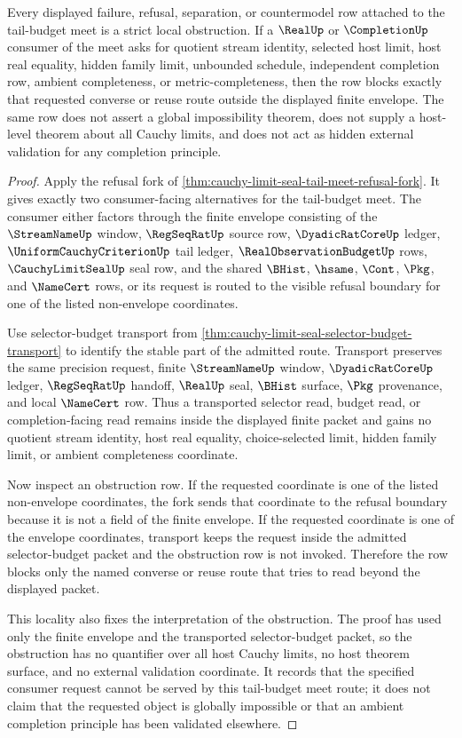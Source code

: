 \begin{corollary}
\label{cor:cauchy-limit-seal-tail-budget-meet-strict-local-obstruction}
Every displayed failure, refusal, separation, or countermodel row attached to the tail-budget meet is a strict local obstruction. If a $\RealUp$ or $\CompletionUp$ consumer of the meet asks for quotient stream identity, selected host limit, host real equality, hidden family limit, unbounded schedule, independent completion row, ambient completeness, or metric-completeness, then the row blocks exactly that requested converse or reuse route outside the displayed finite envelope. The same row does not assert a global impossibility theorem, does not supply a host-level theorem about all Cauchy limits, and does not act as hidden external validation for any completion principle.
\end{corollary}
\begin{proof}
Apply the refusal fork of \autoref{thm:cauchy-limit-seal-tail-meet-refusal-fork}. It gives exactly two consumer-facing alternatives for the tail-budget meet. The consumer either factors through the finite envelope consisting of the $\StreamNameUp$ window, $\RegSeqRatUp$ source row, $\DyadicRatCoreUp$ ledger, $\UniformCauchyCriterionUp$ tail ledger, $\RealObservationBudgetUp$ rows, $\CauchyLimitSealUp$ seal row, and the shared $\BHist$, $\hsame$, $\Cont$, $\Pkg$, and $\NameCert$ rows, or its request is routed to the visible refusal boundary for one of the listed non-envelope coordinates.

Use selector-budget transport from \autoref{thm:cauchy-limit-seal-selector-budget-transport} to identify the stable part of the admitted route. Transport preserves the same precision request, finite $\StreamNameUp$ window, $\DyadicRatCoreUp$ ledger, $\RegSeqRatUp$ handoff, $\RealUp$ seal, $\BHist$ surface, $\Pkg$ provenance, and local $\NameCert$ row. Thus a transported selector read, budget read, or completion-facing read remains inside the displayed finite packet and gains no quotient stream identity, host real equality, choice-selected limit, hidden family limit, or ambient completeness coordinate.

Now inspect an obstruction row. If the requested coordinate is one of the listed non-envelope coordinates, the fork sends that coordinate to the refusal boundary because it is not a field of the finite envelope. If the requested coordinate is one of the envelope coordinates, transport keeps the request inside the admitted selector-budget packet and the obstruction row is not invoked. Therefore the row blocks only the named converse or reuse route that tries to read beyond the displayed packet.

This locality also fixes the interpretation of the obstruction. The proof has used only the finite envelope and the transported selector-budget packet, so the obstruction has no quantifier over all host Cauchy limits, no host theorem surface, and no external validation coordinate. It records that the specified consumer request cannot be served by this tail-budget meet route; it does not claim that the requested object is globally impossible or that an ambient completion principle has been validated elsewhere.
\end{proof}
